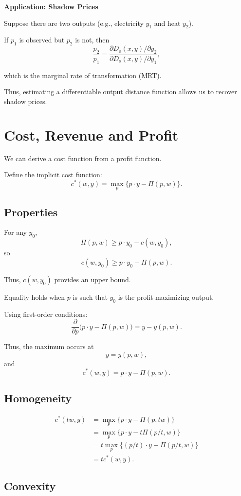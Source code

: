 \textbf{Application: Shadow Prices}

Suppose there are two outputs (e.g., electricity $y_1$ and heat $y_2$).

If $p_1$ is observed but $p_2$ is not, then
\[
\frac{p_2}{p_1}
=
\frac{\partial D_o(x,y)/\partial y_2}
{\partial D_o(x,y)/\partial y_1},
\]

which is the marginal rate of transformation (MRT).

Thus, estimating a differentiable output distance function allows us
to recover shadow prices.

\section{Cost, Revenue and Profit}

We can derive a cost function from a profit function.

Define the implicit cost function:
\[
c^*(w,y)=\max_p \{p\cdot y - \Pi(p,w)\}.
\]

\subsection*{Properties}

For any $y_0$,
\[
\Pi(p,w)\ge p\cdot y_0 - c(w,y_0),
\]
so
\[
c(w,y_0)\ge p\cdot y_0 - \Pi(p,w).
\]

Thus, $c(w,y_0)$ provides an upper bound.

Equality holds when $p$ is such that $y_0$ is the profit-maximizing output.

\medskip

Using first-order conditions:
\[
\frac{\partial}{\partial p}\bigl(p\cdot y - \Pi(p,w)\bigr)
=
y - y(p,w).
\]

Thus, the maximum occurs at
\[
y=y(p,w),
\]
and
\[
c^*(w,y)=p\cdot y - \Pi(p,w).
\]

\subsection*{Homogeneity}

\[
\begin{aligned}
c^*(tw,y)
&=
\max_p \{p\cdot y - \Pi(p,tw)\}\\
&=
\max_p \{p\cdot y - t\Pi(p/t,w)\}\\
&=
t\max_p \{(p/t)\cdot y - \Pi(p/t,w)\}\\
&=
t c^*(w,y).
\end{aligned}
\]

\subsection*{Convexity}


